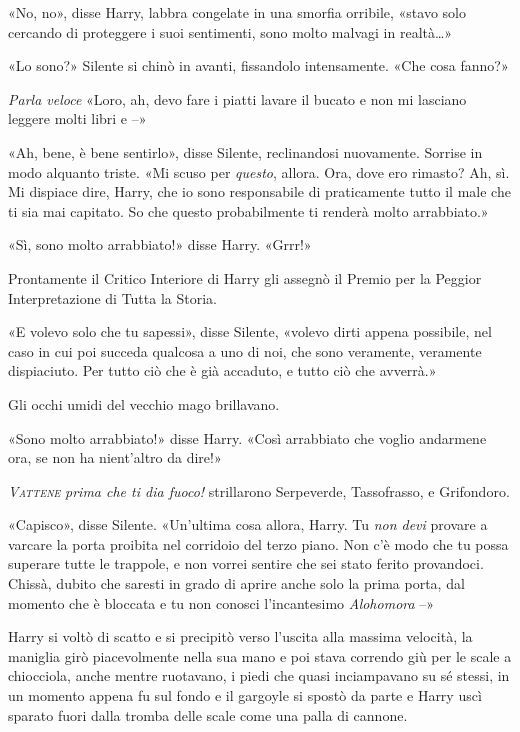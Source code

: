 «No, no», disse Harry, labbra congelate in una smorfia orribile, «stavo solo cercando di proteggere i suoi sentimenti, sono molto malvagi in realtà…»

«Lo sono?» Silente si chinò in avanti, fissandolo intensamente. «Che cosa fanno?»

\textit{Parla veloce} «Loro, ah, devo fare i piatti lavare il bucato e non mi lasciano leggere molti libri e –»

«Ah, bene, è bene sentirlo», disse Silente, reclinandosi nuovamente. Sorrise in modo alquanto triste. «Mi scuso per \textit{questo}, allora. Ora, dove ero rimasto? Ah, sì. Mi dispiace dire, Harry, che io sono responsabile di praticamente tutto il male che ti sia mai capitato. So che questo probabilmente ti renderà molto arrabbiato.»

«Sì, sono molto arrabbiato!» disse Harry. «Grrr!»

Prontamente il Critico Interiore di Harry gli assegnò il Premio per la Peggior Interpretazione di Tutta la Storia.

«E volevo solo che tu sapessi», disse Silente, «volevo dirti appena possibile, nel caso in cui poi succeda qualcosa a uno di noi, che sono veramente, veramente dispiaciuto. Per tutto ciò che è già accaduto, e tutto ciò che avverrà.»

Gli occhi umidi del vecchio mago brillavano.

«Sono molto arrabbiato!» disse Harry. «Così arrabbiato che voglio andarmene ora, se non ha nient’altro da dire!»

\textsl{\textsc{Vattene}} \textit{prima che ti dia fuoco!} strillarono Serpeverde, Tassofrasso, e Grifondoro.

«Capisco», disse Silente. «Un’ultima cosa allora, Harry. Tu \textit{non devi} provare a varcare la porta proibita nel corridoio del terzo piano. Non c’è modo che tu possa superare tutte le trappole, e non vorrei sentire che sei stato ferito provandoci. Chissà, dubito che saresti in grado di aprire anche solo la prima porta, dal momento che è bloccata e tu non conosci l’incantesimo \textit{Alohomora} –»

Harry si voltò di scatto e si precipitò verso l’uscita alla massima velocità, la maniglia girò piacevolmente nella sua mano e poi stava correndo giù per le scale a chiocciola, anche mentre ruotavano, i piedi che quasi inciampavano su sé stessi, in un momento appena fu sul fondo e il gargoyle si spostò da parte e Harry uscì sparato fuori dalla tromba delle scale come una palla di cannone.

